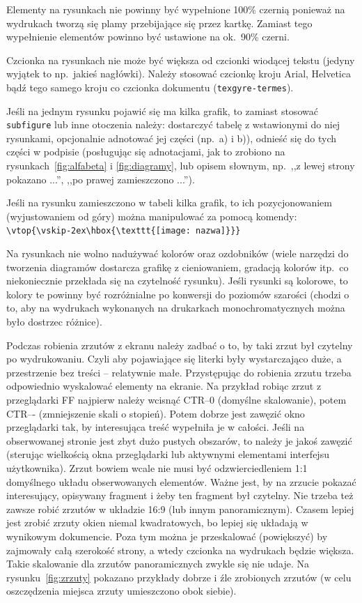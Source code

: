 Elementy na rysunkach nie powinny być wypełnione 100\% czernią ponieważ na wydrukach tworzą się plamy przebijające się przez kartkę. Zamiast tego wypełnienie elementów powinno być ustawione na ok.\ 90\% czerni.

Czcionka na rysunkach nie może być większa od czcionki wiodącej tekstu (jedyny wyjątek to np.\ jakieś nagłówki).
Należy stosować czcionkę kroju Arial, Helvetica bądź tego samego kroju co czcionka dokumentu (\texttt{texgyre-termes}). 

Jeśli na jednym rysunku pojawić się ma kilka grafik, to zamiast stosować \texttt{subfigure} lub inne otoczenia należy: dostarczyć tabelę z wstawionymi do niej rysunkami, opcjonalnie adnotować jej części (np.~a) i b)), odnieść się do tych części w podpisie (posługując się adnotacjami, jak to zrobiono na rysunkach~\ref{fig:alfabeta} i \ref{fig:diagramy}, lub opisem słownym, np.~,,z lewej strony pokazano ...'', ,,po prawej zamieszczono ...'').

Jeśli na rysunku zamieszczono w tabeli kilka grafik, to ich pozycjonowaniem (wyjustowaniem od góry) można manipulować za pomocą komendy:
\verb+\vtop{\vskip-2ex\hbox{\texttt{[image: nazwa]}}}+

Na rysunkach nie wolno nadużywać kolorów oraz ozdobników (wiele narzędzi do tworzenia diagramów dostarcza grafikę z cieniowaniem, gradacją kolorów itp.\  co niekoniecznie przekłada się na czytelność rysunku).
Jeśli rysunki są kolorowe, to kolory te powinny być rozróżnialne po konwersji do poziomów szarości (chodzi o to, aby na wydrukach wykonanych na drukarkach monochromatycznych można było dostrzec różnice).

Podczas robienia zrzutów z ekranu należy zadbać o to, by taki zrzut był czytelny po wydrukowaniu. Czyli aby pojawiające się literki były wystarczająco duże, a przestrzenie bez treści -- relatywnie małe. Przystępując do robienia zrzutu trzeba odpowiednio wyskalować elementy na ekranie. Na przykład robiąc zrzut z przeglądarki FF najpierw należy wcisnąć CTR--0 (domyślne skalowanie), potem CTR--{}- (zmniejszenie skali o stopień). Potem dobrze jest zawęzić okno przeglądarki tak, by interesująca treść wypełniła je w całości. Jeśli na obserwowanej stronie jest zbyt dużo pustych obszarów, to należy je jakoś zawęzić (sterując wielkością okna przeglądarki lub aktywnymi elementami interfejsu użytkownika). Zrzut bowiem wcale nie musi być odzwierciedleniem 1:1 domyślnego układu obserwowanych elementów. Ważne jest, by na zrzucie pokazać interesujący, opisywany fragment i żeby ten fragment był czytelny. Nie trzeba też zawsze robić zrzutów w układzie 16:9 (lub innym panoramicznym). Czasem lepiej jest zrobić zrzuty okien niemal kwadratowych, bo lepiej się układają w wynikowym dokumencie. Poza tym można je przeskalować (powiększyć) by zajmowały całą szerokość strony, a wtedy czcionka na wydrukach będzie większa. Takie skalowanie dla zrzutów panoramicznych zwykle się nie udaje. Na rysunku~\ref{fig:zrzuty} pokazano przykłady dobrze i źle zrobionych zrzutów (w celu oszczędzenia miejsca zrzuty umieszczono obok siebie).
	
